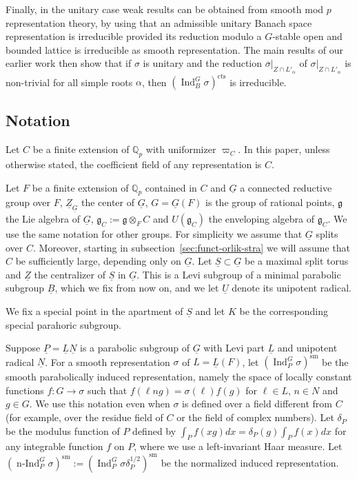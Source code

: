 \documentclass[a4paper]{amsart}
\numberwithin{equation}{section}
\theoremstyle{remark}
\theoremstyle{definition}
\DeclareMathOperator{\Ind}{Ind}
\DeclareMathOperator{\nInd}{n-Ind}
\newcommand{\Q}{\mathbb{Q}}
\newcommand{\sm}{\mathrm{sm}}
\newcommand{\alggrp}[1]{\underline{#1}}
\newcommand{\cts}{\mathrm{cts}}
\renewcommand{\o}[1]{\overline{#1}}
\begin{document}
Finally, in the unitary case weak results can be obtained from smooth mod $p$ representation theory, by using that an admissible unitary Banach space representation is irreducible provided its reduction modulo a $G$-stable open and bounded lattice is irreducible as smooth representation.
The main results of our earlier work \cite{AHHV} then show that if $\sigma$ is unitary and the reduction $\o\sigma|_{Z \cap L'_{\alpha}}$ of $\sigma|_{Z \cap L'_{\alpha}}$ is non-trivial for all simple roots $\alpha$, then $(\Ind_{B}^{G}\sigma)^{\cts}$ is irreducible.

\subsection{Notation}
\label{sec:notation}
Let $C$ be a finite extension of $\Q_{p}$ with uniformizer $\varpi_C$.
In this paper, unless otherwise stated, the coefficient field of any representation is $C$.

Let $F$ be a finite extension of $\Q_{p}$ contained in $C$ and $\alggrp{G}$ a connected reductive group over $F$, $\alggrp{Z}_{\alggrp{G}}$ the center of $\alggrp{G}$, $G = \alggrp{G}(F)$ is the group of rational points, $\mathfrak{g}$ the Lie algebra of $\alggrp{G}$, $\mathfrak{g}_{C} := \mathfrak{g}\otimes_{F}C$ and $U(\mathfrak{g}_{C})$ the enveloping algebra of $\mathfrak{g}_{C}$.
We use the same notation for other groups.
For simplicity we assume that $\alggrp{G}$ splits over $C$.
Moreover, starting in subsection~\ref{sec:funct-orlik-stra} we will assume that $C$ be sufficiently large, depending only on $\alggrp G$.
Let $\alggrp{S}\subset \alggrp{G}$ be a maximal split torus and $\alggrp{Z}$ the centralizer of $\alggrp{S}$ in $\alggrp{G}$.
This is a Levi subgroup of a minimal parabolic subgroup $\alggrp{B}$, which we fix from now on, and we let $\alggrp{U}$ denote its unipotent radical.

We fix a special point in the apartment of $\alggrp{S}$ and let $K$ be the corresponding special parahoric subgroup.

Suppose $\alggrp{P} = \alggrp{L}\alggrp{N}$ is a parabolic subgroup of $\alggrp{G}$ with Levi part $\alggrp{L}$ and unipotent radical $\alggrp{N}$.
For a smooth representation $\sigma$ of $L = \alggrp{L}(F)$, let $(\Ind_{P}^{G}\sigma)^{\sm}$ be the smooth parabolically induced representation, namely the space of locally constant functions $f\colon G\to \sigma$ such that $f(\ell ng) = \sigma(\ell )f(g)$ for $\ell \in L$, $n\in N$ and $g\in G$.
We use this notation even when $\sigma$ is defined over a field different from $C$ (for example, over the residue field of $C$ or the field of complex numbers).
Let $\delta_{P}$ be the modulus function of $P$ defined by $\int_{P}f(xg)dx = \delta_{P}(g)\int_{P}f(x)dx$ for any integrable function $f$ on $P$, where we use a left-invariant Haar measure.
Let $(\nInd_{P}^{G}\sigma)^{\sm} := (\Ind_{P}^{G}\sigma\delta_{P}^{1/2})^{\sm}$ be the normalized induced representation.
\end{document}
